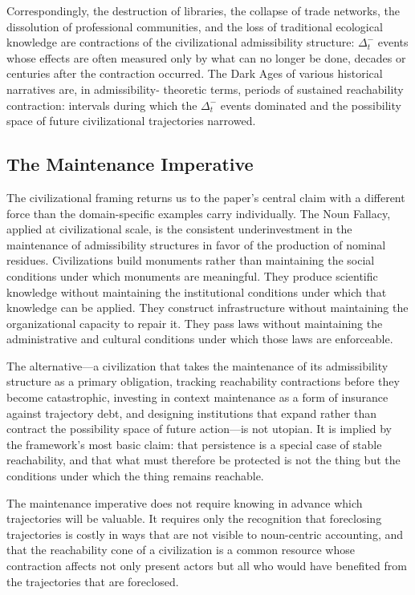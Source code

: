 \documentclass[12pt, a4paper]{article}
\theoremstyle{plain}
\theoremstyle{definition}
\theoremstyle{remark}
\begin{document}
Correspondingly, the destruction of libraries, the collapse of trade networks,
the dissolution of professional communities, and the loss of traditional
ecological knowledge are contractions of the civilizational admissibility
structure: $\Delta_t^-$ events whose effects are often measured only by
what can no longer be done, decades or centuries after the contraction
occurred. The Dark Ages of various historical narratives are, in admissibility-
theoretic terms, periods of sustained reachability contraction: intervals
during which the $\Delta_t^-$ events dominated and the possibility space
of future civilizational trajectories narrowed.

\subsection{The Maintenance Imperative}

The civilizational framing returns us to the paper's central claim with a
different force than the domain-specific examples carry individually. The
Noun Fallacy, applied at civilizational scale, is the consistent
underinvestment in the maintenance of admissibility structures in favor of
the production of nominal residues. Civilizations build monuments rather
than maintaining the social conditions under which monuments are meaningful.
They produce scientific knowledge without maintaining the institutional
conditions under which that knowledge can be applied. They construct
infrastructure without maintaining the organizational capacity to repair it.
They pass laws without maintaining the administrative and cultural conditions
under which those laws are enforceable.

The alternative---a civilization that takes the maintenance of its admissibility
structure as a primary obligation, tracking reachability contractions before
they become catastrophic, investing in context maintenance as a form of
insurance against trajectory debt, and designing institutions that expand
rather than contract the possibility space of future action---is not utopian.
It is implied by the framework's most basic claim: that persistence is a
special case of stable reachability, and that what must therefore be
protected is not the thing but the conditions under which the thing remains
reachable.

The maintenance imperative does not require knowing in advance which
trajectories will be valuable. It requires only the recognition that
foreclosing trajectories is costly in ways that are not visible to noun-centric
accounting, and that the reachability cone of a civilization is a common
resource whose contraction affects not only present actors but all who would
have benefited from the trajectories that are foreclosed.
\end{document}
